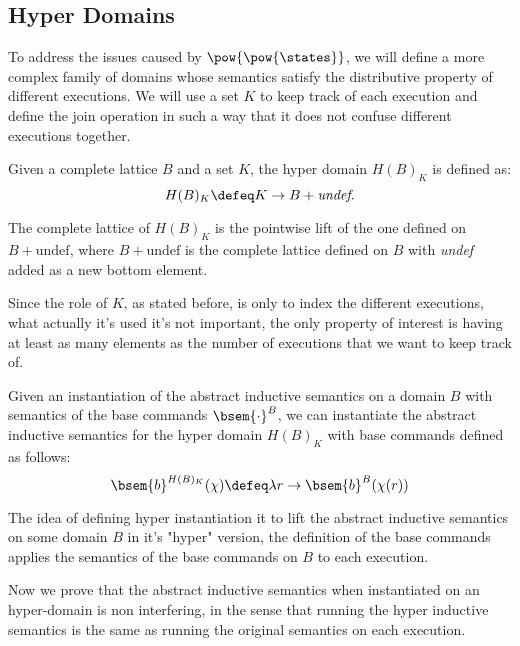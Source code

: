 \subsection{Hyper Domains}

To address the issues caused by $\pow{\pow{\states}}$, we will define a more 
complex family of domains whose semantics satisfy the distributive property of 
different executions. We will use a set $K$ to keep track of each execution and 
define the join operation in such a way that it does not confuse different 
executions together.

\begin{definition}
  Given a complete lattice $B$ and a set $K$, the hyper domain $H(B)_K$ is 
  defined as:
  $$H(B)_K \defeq K \to B + \textit{undef}.$$

  The complete lattice of $H(B)_K$ is the pointwise lift of the one defined on 
  $B + \text{undef}$, where $B + \text{undef}$ is the complete lattice defined 
  on $B$ with \textit{undef} added as a new bottom element.
\end{definition}

Since the role of $K$, as stated before, is only to index the different 
executions, what actually it's used it's not important, the only property of
interest is having at least as many elements as the number of executions that
we want to keep track of.

\begin{definition}
  Given an instantiation of the abstract inductive semantics on a domain $B$ 
  with semantics of the base commands $\bsem{\cdot}^B$, we can instantiate the 
  abstract inductive semantics for the hyper domain $H(B)_K$ with base 
  commands defined as follows:
  $$\bsem{b}^{H(B)_K}(\chi) \defeq \lambda r \to \bsem{b}^B(\chi(r))$$
\end{definition}

The idea of defining hyper instantiation it to lift the abstract inductive 
semantics on some domain $B$ in it's "hyper" version, the definition of the base 
commands applies the semantics of the base commands on $B$ to each execution.

Now we prove that the abstract inductive semantics when instantiated on an 
hyper-domain is non interfering, in the sense that
running the hyper inductive semantics is the same as running the 
original semantics on each execution.

